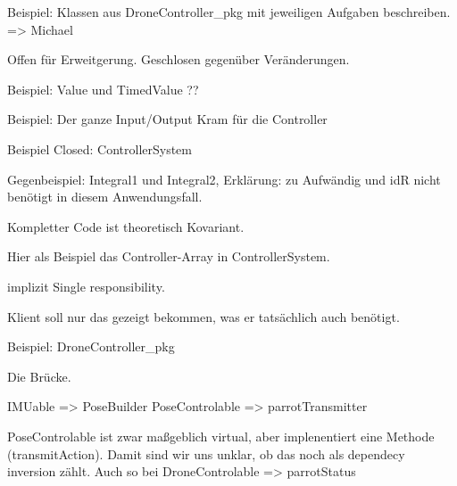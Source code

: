 

\missing[Sem5 VL4]







Beispiel: Klassen aus DroneController\_pkg mit jeweiligen Aufgaben beschreiben.
=> Michael






Offen für Erweitgerung. Geschlosen gegenüber Veränderungen.


Beispiel: Value und TimedValue ??

Beispiel: Der ganze Input/Output Kram für die Controller

Beispiel Closed: ControllerSystem

Gegenbeispiel: Integral1 und Integral2, Erklärung: zu Aufwändig und idR nicht benötigt in diesem Anwendungsfall.




Kompletter Code ist theoretisch Kovariant.

Hier als Beispiel das Controller-Array in ControllerSystem.





implizit Single responsibility.

Klient soll nur das gezeigt bekommen, was er tatsächlich auch benötigt.

Beispiel: DroneController\_pkg










Die Brücke.

IMUable => PoseBuilder
PoseControlable => parrotTransmitter


PoseControlable ist zwar maßgeblich virtual, aber implenentiert eine Methode (transmitAction). Damit sind wir uns unklar, ob das noch als dependecy inversion zählt.
Auch so bei DroneControlable => parrotStatus
























